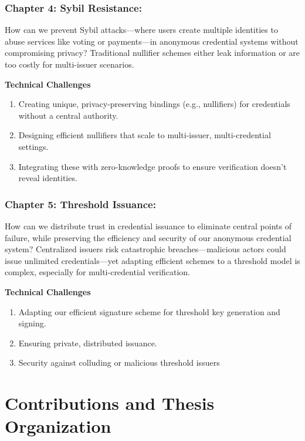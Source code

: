 \subsubsection*{Chapter 4: Sybil Resistance: } 
How can we prevent Sybil attacks—where users create multiple identities to abuse services like voting or payments—in anonymous credential systems without compromising privacy? Traditional nullifier schemes either leak information or are too costly for multi-issuer scenarios.

\noindent \textbf{Technical Challenges}
\begin{enumerate}
    \item Creating unique, privacy-preserving bindings (e.g., nullifiers) for credentials without a central authority.
    \item Designing efficient nullifiers that scale to multi-issuer, multi-credential settings.
    \item Integrating these with zero-knowledge proofs to ensure verification doesn’t reveal identities.
\end{enumerate}



\subsubsection*{Chapter 5: Threshold Issuance: } 
How can we distribute trust in credential issuance to eliminate central points of failure, while preserving the efficiency and security of our anonymous credential system? Centralized issuers risk catastrophic breaches—malicious actors could issue unlimited credentials—yet adapting efficient schemes to a threshold model is complex, especially for multi-credential verification.

\noindent \textbf{Technical Challenges}
\begin{enumerate}
    \item Adapting our efficient signature scheme for threshold key generation and signing.
    \item Ensuring private, distributed issuance.
    \item Security against colluding or malicious threshold issuers
\end{enumerate}

\section{Contributions and Thesis Organization}

